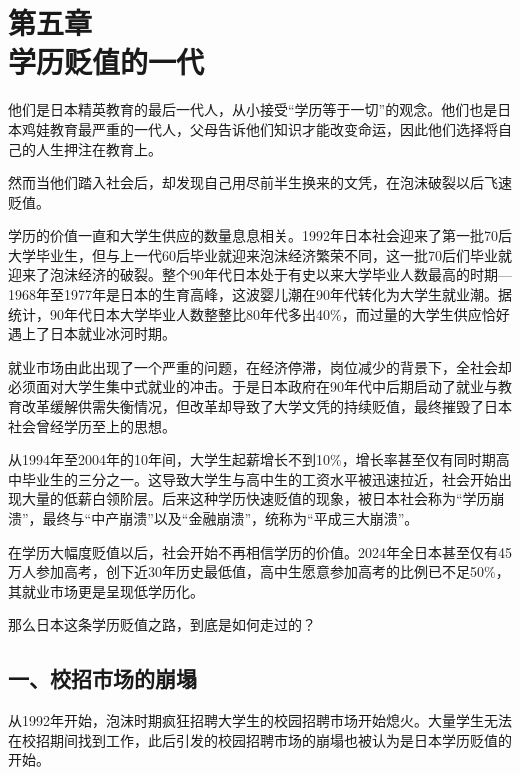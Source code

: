 

\section[第五章\q 学历贬值的一代]{第五章\\ 学历贬值的一代}


{\fangsong 他们是日本精英教育的最后一代人，从小接受“学历等于一切”的观念。他们也是日本鸡娃教育最严重的一代人，父母告诉他们知识才能改变命运，因此他们选择将自己的人生押注在教育上。\par}

{\fangsong 然而当他们踏入社会后，却发现自己用尽前半生换来的文凭，在泡沫破裂以后飞速贬值。\par}

学历的价值一直和大学生供应的数量息息相关。1992年日本社会迎来了第一批70后大学毕业生，但与上一代60后毕业就迎来泡沫经济繁荣不同，这一批70后们毕业就迎来了泡沫经济的破裂。整个90年代日本处于有史以来大学毕业人数最高的时期—1968年至1977年是日本的生育高峰，这波婴儿潮在90年代转化为大学生就业潮。据统计，90年代日本大学毕业人数整整比80年代多出40\%，而过量的大学生供应恰好遇上了日本就业冰河时期。

就业市场由此出现了一个严重的问题，在经济停滞，岗位减少的背景下，全社会却必须面对大学生集中式就业的冲击。于是日本政府在90年代中后期启动了就业与教育改革缓解供需失衡情况，但改革却导致了大学文凭的持续贬值，最终摧毁了日本社会曾经学历至上的思想。

从1994年至2004年的10年间，大学生起薪增长不到10\%，增长率甚至仅有同时期高中毕业生的三分之一。这导致大学生与高中生的工资水平被迅速拉近，社会开始出现大量的低薪白领阶层。后来这种学历快速贬值的现象，被日本社会称为“学历崩溃”，最终与“中产崩溃”以及“金融崩溃”，统称为“平成三大崩溃”。

在学历大幅度贬值以后，社会开始不再相信学历的价值。2024年全日本甚至仅有45万人参加高考，创下近30年历史最低值，高中生愿意参加高考的比例已不足50\%，其就业市场更是呈现低学历化。

那么日本这条学历贬值之路，到底是如何走过的？

\subsection{一、校招市场的崩塌}

从1992年开始，泡沫时期疯狂招聘大学生的校园招聘市场开始熄火。大量学生无法在校招期间找到工作，此后引发的校园招聘市场的崩塌也被认为是日本学历贬值的开始。

